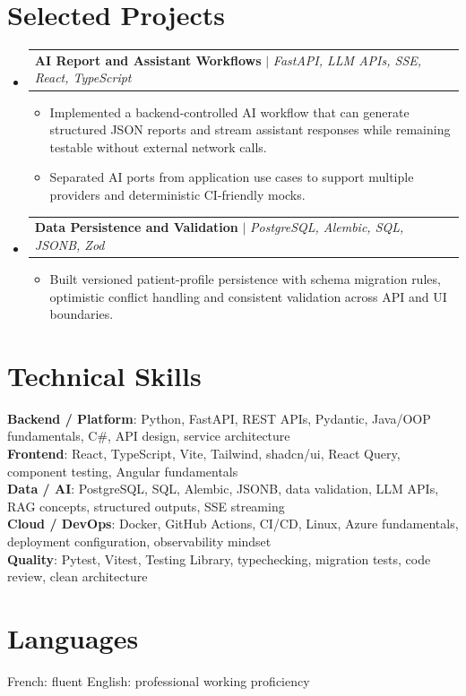 \documentclass[letterpaper,11pt]{article}
\makeatletter
\newcommand{\resumeItem}[1]{\item\small{#1 \vspace{-2pt}}}
\newcommand{\resumeProjectHeading}[2]{
    \item
    \begin{tabular*}{0.97\textwidth}{l@{\extracolsep{\fill}}r}
      \small#1 & #2 \\
    \end{tabular*}\vspace{-7pt}
}
\newcommand{\resumeSubHeadingListStart}{\begin{itemize}[leftmargin=0.15in, label={}]}
\newcommand{\resumeSubHeadingListEnd}{\end{itemize}}
\newcommand{\resumeItemListStart}{\begin{itemize}[leftmargin=0.18in]}
\newcommand{\resumeItemListEnd}{\end{itemize}\vspace{-5pt}}
\makeatother
\begin{document}
\section{Selected Projects}
\resumeSubHeadingListStart
  \resumeProjectHeading
    {\textbf{AI Report and Assistant Workflows} $|$ \emph{FastAPI, LLM APIs, SSE, React, TypeScript}}{}
    \resumeItemListStart
      \resumeItem{Implemented a backend-controlled AI workflow that can generate structured JSON reports and stream assistant responses while remaining testable without external network calls.}
      \resumeItem{Separated AI ports from application use cases to support multiple providers and deterministic CI-friendly mocks.}
    \resumeItemListEnd
  \resumeProjectHeading
    {\textbf{Data Persistence and Validation} $|$ \emph{PostgreSQL, Alembic, SQL, JSONB, Zod}}{}
    \resumeItemListStart
      \resumeItem{Built versioned patient-profile persistence with schema migration rules, optimistic conflict handling and consistent validation across API and UI boundaries.}
    \resumeItemListEnd
\resumeSubHeadingListEnd

\section{Technical Skills}
\begin{itemize}[leftmargin=0.15in, label={}]
  \small{\item{
    \textbf{Backend / Platform}{: Python, FastAPI, REST APIs, Pydantic, Java/OOP fundamentals, C\#, API design, service architecture} \\
    \textbf{Frontend}{: React, TypeScript, Vite, Tailwind, shadcn/ui, React Query, component testing, Angular fundamentals} \\
    \textbf{Data / AI}{: PostgreSQL, SQL, Alembic, JSONB, data validation, LLM APIs, RAG concepts, structured outputs, SSE streaming} \\
    \textbf{Cloud / DevOps}{: Docker, GitHub Actions, CI/CD, Linux, Azure fundamentals, deployment configuration, observability mindset} \\
    \textbf{Quality}{: Pytest, Vitest, Testing Library, typechecking, migration tests, code review, clean architecture}
  }}
\end{itemize}

\section{Languages}
\small{French: fluent \quad English: professional working proficiency}
\end{document}
